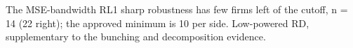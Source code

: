 \par\noindent\begin{minipage}{\linewidth}\footnotesize
The MSE-bandwidth RL1 sharp robustness has few firms left of the cutoff, n = 14 (22 right); the approved minimum is 10 per side. Low-powered RD, supplementary to the bunching and decomposition evidence.
\end{minipage}\par
